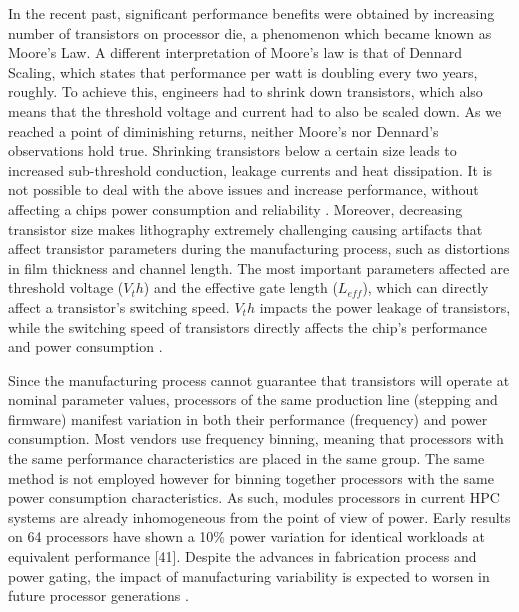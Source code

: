
In the recent past, significant performance benefits were obtained by increasing number of
transistors on processor die, a phenomenon which became known as Moore's Law.  A different
interpretation of Moore's law is that of Dennard Scaling, which states that performance
per watt is doubling every two years, roughly.  To achieve this, engineers had to shrink
down transistors, which also means that the threshold voltage and current had to also be
scaled down.  As we reached a point of diminishing returns, neither Moore's nor Dennard's
observations hold true.  Shrinking transistors below a certain size leads to increased
sub-threshold conduction, leakage currents and heat dissipation.  It is not possible to
deal with the above issues and increase performance, without affecting a chips power
consumption and reliability \cite{Esmaeilzadeh:2013:PCM:2408776.2408797}.  Moreover,
decreasing transistor size makes lithography extremely challenging causing artifacts that
affect transistor parameters during the manufacturing process, such as distortions in film
thickness and channel length. The most important parameters affected are threshold voltage
($V_th$) and the effective gate length ($L_{eff}$), which can directly affect a transistor's
switching speed.  $V_th$ impacts the power leakage of transistors, while the switching
speed of transistors directly affects the chip's performance and power consumption
\cite{Borkar:2003:PVI:775832.775920,915379}.  

Since the manufacturing process cannot guarantee that transistors will operate at nominal
parameter values, processors of the same production line (stepping and firmware) manifest
variation in both their performance (frequency) and power consumption.  Most vendors use
frequency binning, meaning that processors with the same performance characteristics are
placed in the same group.  The same method is not employed however for binning together
processors with the same power consumption characteristics.  As such, modules processors
in current HPC systems are already inhomogeneous from the point of view of power.  Early
results on 64 processors have shown a 10\% power variation for identical workloads at
equivalent performance [41].  Despite the advances in fabrication process and power
gating, the impact of manufacturing variability is expected to worsen in future processor
generations \cite{1382598,Marathe:2017:ESP:3149412.3149421}. 

